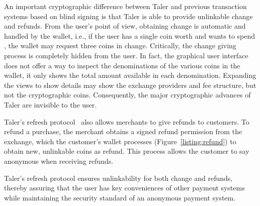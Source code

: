 \documentclass{llncs}
\begin{document}
An important cryptographic difference between Taler and previous
transaction systems based on blind signing is that Taler is able to
provide unlinkable change and refunds.  From the user's point of view,
obtaining change is automatic and handled by the wallet, i.e., if the
user has a single coin worth  and wants to spend , the
wallet may request three  coins in change. Critically, the
change giving process is completely hidden from the user.
In fact, the graphical user
interface does not offer a way to inspect the denominations of the
various coins in the wallet, it only shows the total amount available
in each denomination.  Expanding the views to show details may show
the exchange providers and fee structure, but not the cryptographic
coins.  Consequently, the major cryptographic advances of Taler are
invisible to the user.

Taler's refresh protocol~\cite{talercrypto} also allows merchants to give
refunds to customers. To refund a purchase, the merchant obtains a signed refund permission
from the exchange, which the customer's wallet processes
(Figure~\ref{listing:refund}) to obtain new, unlinkable coins as refund.
This process allows the customer to say anonymous when receiving refunds.

Taler's refresh protocol ensures unlinkability for both change and
refunds, thereby assuring that the user has key conveniences of other
payment systems while maintaining the security standard of an
anonymous payment system.
\end{document}
